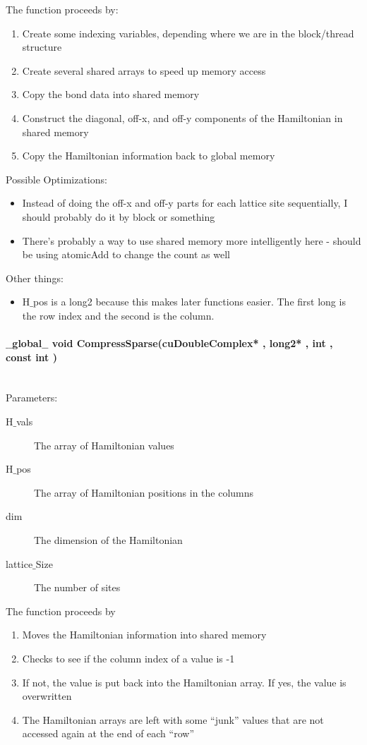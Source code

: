 \documentclass{article}
\begin{document}
The function proceeds by:
\begin{enumerate}
\item{Create some indexing variables, depending where we are in the block/thread structure}
\item{Create several shared arrays to speed up memory access}
\item{Copy the bond data into shared memory}
\item{Construct the diagonal, off-x, and off-y components of the Hamiltonian in shared memory}
\item{Copy the Hamiltonian information back to global memory}
\end{enumerate}

Possible Optimizations:
\begin{itemize}
\item{Instead of doing the off-x and off-y parts for each lattice site sequentially, I should probably do it by block or something}
\item{There's probably a way to use shared memory more intelligently here - should be using atomicAdd to change the count as well}
\end{itemize}

Other things:
\begin{itemize}
\item{H$\_$pos is a long2 because this makes later functions easier. The first long is the row index and the second is the column.}
\end{itemize}

\paragraph{ $\_\_$global$\_\_$ void CompressSparse(cuDoubleComplex* , long2* , int , const int )}
\\
Parameters:
\begin{description}
\item[H$\_$vals] The array of Hamiltonian values
\item[H$\_$pos] The array of Hamiltonian positions in the columns
\item[dim] The dimension of the Hamiltonian
\item[lattice$\_$Size] The number of sites
\end{description}

The function proceeds by
\begin{enumerate}
\item{Moves the Hamiltonian information into shared memory}
\item{Checks to see if the column index of a value is -1}
\item{If not, the value is put back into the Hamiltonian array. If yes, the value is overwritten}
\item{The Hamiltonian arrays are left with some ``junk'' values that are not accessed again at the end of each ``row''}
\end{enumerate}
\end{document}
